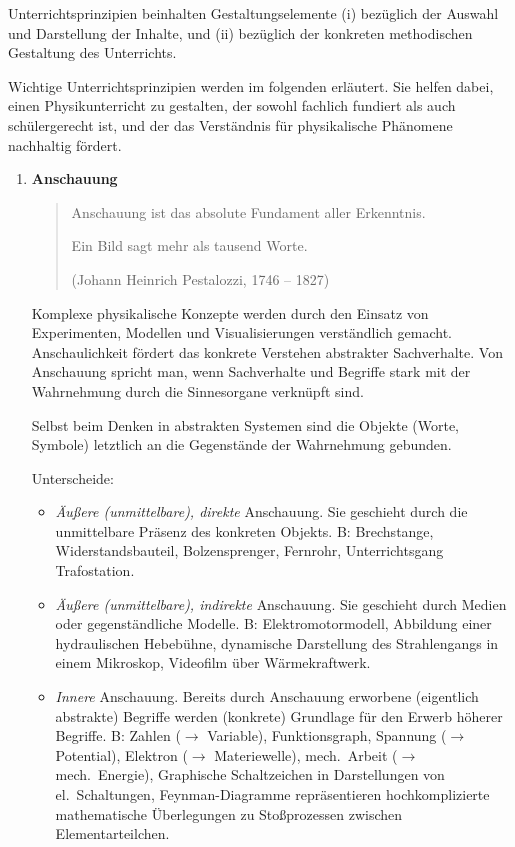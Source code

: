 \bip
Unterrichtsprinzipien beinhalten Gestaltungselemente (i) bez\"{u}glich der Auswahl und Darstellung der Inhalte, und (ii) bez\"{u}glich der konkreten methodischen Gestaltung des Unterrichts.

\bip
Wichtige Unterrichtsprinzipien werden im folgenden erl\"{a}utert. Sie helfen dabei, einen Physikunterricht zu gestalten, der sowohl fachlich fundiert als auch sch\"{u}lergerecht ist, und der das Verst\"{a}ndnis f\"{u}r physikalische Ph\"{a}nomene nachhaltig f\"{o}rdert.

\begin{enumerate}
	\item \textbf{Anschauung}
	\begin{quote}
		Anschauung ist das absolute Fundament aller Erkenntnis.

		\mip
		Ein Bild sagt mehr als tausend Worte.

		\mip
		(Johann Heinrich Pestalozzi, 1746 -- 1827)
	\end{quote}

	Komplexe physikalische Konzepte werden durch den Einsatz von Experimenten, Modellen und Visualisierungen verst\"{a}ndlich gemacht. Anschaulichkeit f\"{o}rdert das konkrete Verstehen abstrakter Sachverhalte. Von Anschauung spricht man, wenn Sachverhalte und Begriffe stark mit der Wahrnehmung durch die Sinnesorgane verkn\"{u}pft sind.

	Selbst beim Denken in abstrakten Systemen sind die Objekte (Worte, Symbole) letztlich an die Gegenst\"{a}nde der Wahrnehmung gebunden.

	Unterscheide:
	\begin{itemize}
		\item {\it \"{A}u{\ss}ere (unmittelbare), direkte } Anschauung.
		Sie geschieht durch die unmittelbare Pr\"{a}senz des konkreten Objekts.
		\mip
		B: Brechstange, Widerstandsbauteil, Bolzensprenger, Fernrohr, Unterrichtsgang Trafostation.

		\item {\it \"{A}u{\ss}ere (unmittelbare), indirekte } Anschauung.
		Sie geschieht durch Medien oder gegenst\"{a}ndliche Modelle.
		\mip
		B: Elektromotormodell, Abbildung einer hydraulischen Hebeb\"{u}hne,
		dynamische Darstellung des Strahlengangs in einem Mikroskop,
		Videofilm \"{u}ber W\"{a}rmekraftwerk.
		\item {\it Innere}  Anschauung.
		Bereits durch Anschauung erworbene (eigentlich abstrakte) Begriffe werden (konkrete) Grundlage f\"{u}r den Erwerb h\"{o}herer Begriffe.
		\mip
		B: Zahlen ($\to$ Variable), Funktionsgraph, Spannung ($\to$ Potential), Elektron ($\to$ Materiewelle), mech.\ Arbeit ($\to$ mech.\ Energie), Graphische Schaltzeichen in Darstellungen von el.\ Schaltungen, Feynman-Diagramme repr\"{a}sentieren hochkomplizierte mathematische \"{U}berlegungen zu Sto{\ss}prozessen zwischen Elementar\-teilchen.


\end{itemize}
\end{enumerate}
